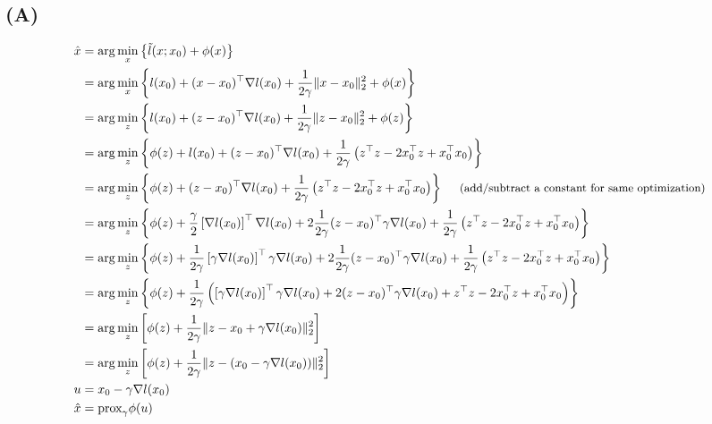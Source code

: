 \documentclass{article}
\begin{document}
\subsection{(A)}
\begin{align*}
\hat{x}&=\arg\min_x \left\{ \tilde{l}(x;x_0)+\phi(x) \right\}\\
&=\arg\min_x \left\{ l(x_0) + (x-x_0)^\top \nabla l(x_0) + \frac{1}{2\gamma} \lVert x-x_0 \rVert_2^2+\phi(x) \right\}\\
&=\arg\min_z \left\{ l(x_0) + (z-x_0)^\top \nabla l(x_0) + \frac{1}{2\gamma} \lVert z-x_0 \rVert_2^2+\phi(z) \right\}\\
&=\arg\min_z \left\{ \phi(z) + l(x_0) + (z-x_0)^\top \nabla l(x_0) + \frac{1}{2\gamma} \left(z^\top z - 2x_0^\top z + x_0^\top x_0 \right) \right\}\\
&=\arg\min_z \left\{ \phi(z) + (z-x_0)^\top \nabla l(x_0) + \frac{1}{2\gamma} \left(z^\top z - 2x_0^\top z + x_0^\top x_0 \right) \right\}~~~~{\small\textrm{(add/subtract a constant for same optimization)}}\\
&=\arg\min_z \left\{ \phi(z) + \frac{\gamma}{2}\left[\nabla l(x_0)\right]^\top\nabla l(x_0)+2\frac{1}{2\gamma}(z-x_0)^\top \gamma\nabla l(x_0) + \frac{1}{2\gamma} \left(z^\top z - 2x_0^\top z + x_0^\top x_0 \right) \right\}\\
&=\arg\min_z \left\{ \phi(z) + \frac{1}{2\gamma}\left[\gamma\nabla l(x_0)\right]^\top\gamma\nabla l(x_0)+2\frac{1}{2\gamma}(z-x_0)^\top \gamma\nabla l(x_0) + \frac{1}{2\gamma} \left(z^\top z - 2x_0^\top z + x_0^\top x_0 \right) \right\}\\
&=\arg\min_z \left\{ \phi(z) + \frac{1}{2\gamma}\left(\left[\gamma\nabla l(x_0)\right]^\top\gamma\nabla l(x_0)+2(z-x_0)^\top \gamma\nabla l(x_0) +  z^\top z - 2x_0^\top z + x_0^\top x_0 \right) \right\}\\
&=\arg\min_z \left[\phi(z) + \frac{1}{2\gamma} \lVert z - x_0 + \gamma\nabla l(x_0) \rVert_2^2\right]\\
&=\arg\min_z \left[\phi(z) + \frac{1}{2\gamma} \lVert z - (x_0 - \gamma\nabla l(x_0)) \rVert_2^2\right]\\
u&=x_0-\gamma\nabla l(x_0)\\
\hat{x}&=\textrm{prox}_\gamma \phi(u)\\
\end{align*}
\end{document}
